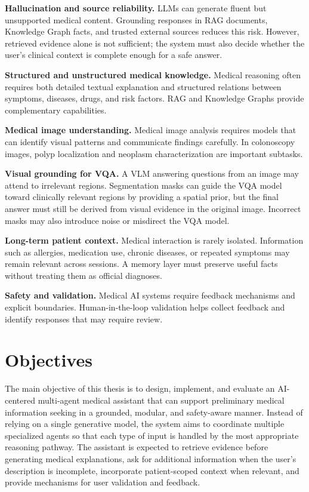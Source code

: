 \textbf{Hallucination and source reliability.} LLMs can generate fluent but unsupported medical content. Grounding responses in RAG documents, Knowledge Graph facts, and trusted external sources reduces this risk. However, retrieved evidence alone is not sufficient; the system must also decide whether the user's clinical context is complete enough for a safe answer.

\textbf{Structured and unstructured medical knowledge.} Medical reasoning often requires both detailed textual explanation and structured relations between symptoms, diseases, drugs, and risk factors. RAG and Knowledge Graphs provide complementary capabilities.

\textbf{Medical image understanding.} Medical image analysis requires models that can identify visual patterns and communicate findings carefully. In colonoscopy images, polyp localization and neoplasm characterization are important subtasks.

\textbf{Visual grounding for VQA.} A VLM answering questions from an image may attend to irrelevant regions. Segmentation masks can guide the VQA model toward clinically relevant regions by providing a spatial prior, but the final answer must still be derived from visual evidence in the original image. Incorrect masks may also introduce noise or misdirect the VQA model.

\textbf{Long-term patient context.} Medical interaction is rarely isolated. Information such as allergies, medication use, chronic diseases, or repeated symptoms may remain relevant across sessions. A memory layer must preserve useful facts without treating them as official diagnoses.

\textbf{Safety and validation.} Medical AI systems require feedback mechanisms and explicit boundaries. Human-in-the-loop validation helps collect feedback and identify responses that may require review.

\section{Objectives}

The main objective of this thesis is to design, implement, and evaluate an AI-centered multi-agent medical assistant that can support preliminary medical information seeking in a grounded, modular, and safety-aware manner. Instead of relying on a single generative model, the system aims to coordinate multiple specialized agents so that each type of input is handled by the most appropriate reasoning pathway. The assistant is expected to retrieve evidence before generating medical explanations, ask for additional information when the user's description is incomplete, incorporate patient-scoped context when relevant, and provide mechanisms for user validation and feedback.


